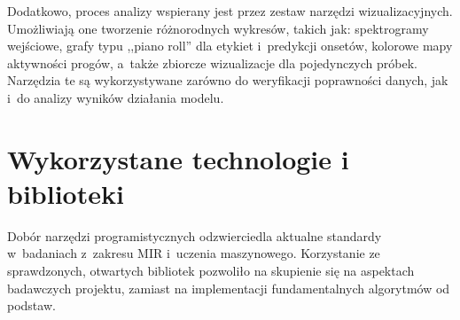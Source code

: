 Dodatkowo, proces analizy wspierany jest przez zestaw narzędzi wizualizacyjnych. Umożliwiają one tworzenie różnorodnych wykresów, takich jak: spektrogramy wejściowe, grafy typu ,,piano roll'' dla etykiet i~predykcji onsetów, kolorowe mapy aktywności progów, a~także zbiorcze wizualizacje dla pojedynczych próbek. Narzędzia te są wykorzystywane zarówno do weryfikacji poprawności danych, jak i~do analizy wyników działania modelu.

\section{Wykorzystane technologie i biblioteki}
\label{sec:technologie_biblioteki}

Dobór narzędzi programistycznych odzwierciedla aktualne standardy w~badaniach z~zakresu MIR i~uczenia maszynowego. Korzystanie ze sprawdzonych, otwartych bibliotek pozwoliło na skupienie się na aspektach badawczych projektu, zamiast na implementacji fundamentalnych algorytmów od podstaw.
